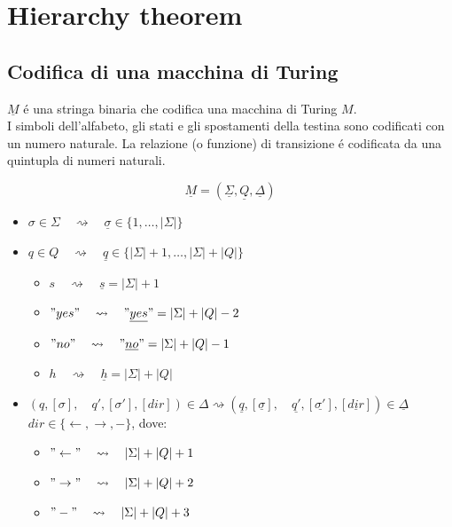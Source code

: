 \section{Hierarchy theorem}
\label{sec:hierarchy_theorem}

\subsection{Codifica di una macchina di Turing}
$\underline{M}$ é una stringa binaria che codifica una macchina di Turing $M$. \\
I simboli dell'alfabeto, gli stati e gli spostamenti della testina sono codificati con un numero naturale.
La relazione (o funzione) di transizione é codificata da una quintupla di numeri naturali.

\[\underline{M} = (\underline{\Sigma}, \underline{Q}, \underline{\Delta})\]

\begin{itemize}
    \item $\sigma \in \Sigma \quad \rightsquigarrow \quad \underline{\sigma} \in \{1, \dots, |\Sigma|\}$
    \item $q \in Q \quad \rightsquigarrow \quad \underline{q} \in \{|\Sigma| + 1, \dots, |\Sigma| + |Q|\}$
    \begin{itemize}
        \item $s     \quad \rightsquigarrow \quad \underline{s}     = |\Sigma| + 1$
        \item $"yes" \quad \rightsquigarrow \quad "\underline{yes}" = |\Sigma| + |Q| - 2$
        \item $"no"  \quad \rightsquigarrow \quad "\underline{no}"  = |\Sigma| + |Q| - 1$
        \item $h     \quad \rightsquigarrow \quad \underline{h}     = |\Sigma| + |Q|$
    \end{itemize}
    \item $(q, [\sigma], \quad q', [\sigma'], [dir]) \in \Delta \rightsquigarrow (\underline{q}, [\underline{\sigma}], \quad \underline{q'}, [\underline{\sigma'}], [\underline{dir}]) \in \underline{\Delta}$
    \subitem $dir \in \{ \leftarrow, \rightarrow, -\}$, dove:
    \begin{itemize}
        \item $"\leftarrow" \quad \rightsquigarrow \quad |\Sigma| + |Q| + 1$
        \item $"\rightarrow" \quad \rightsquigarrow \quad |\Sigma| + |Q| + 2$
        \item $"- " \quad \rightsquigarrow \quad |\Sigma| + |Q| + 3$
    \end{itemize}
\end{itemize}

